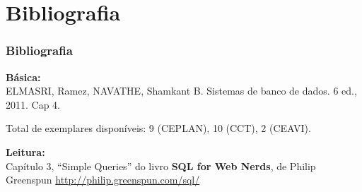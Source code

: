 \documentclass[aspectratio=169]{beamer}
\begin{document}
		\section{Bibliografia}
			\begin{frame}
				\frametitle{Bibliografia}
				\textbf{Básica:}\\
				ELMASRI, Ramez, NAVATHE, Shamkant B. Sistemas de banco de dados. 6 ed., 2011. Cap 4.
				
				\textcolor{ExecusharesGrey}{\small\hspace{1em} Total de exemplares disponíveis: 9 (CEPLAN), 10 (CCT), 2 (CEAVI). }
				
				\BlankLine\BlankLine
				\textbf{Leitura:}\\
				Capítulo 3, “Simple Queries” do livro \textbf{SQL
				for Web Nerds}, de Philip Greenspun
				\url{http://philip.greenspun.com/sql/}
			\end{frame}
		
		\frame{\acknowledgmentpage}
\end{document}
